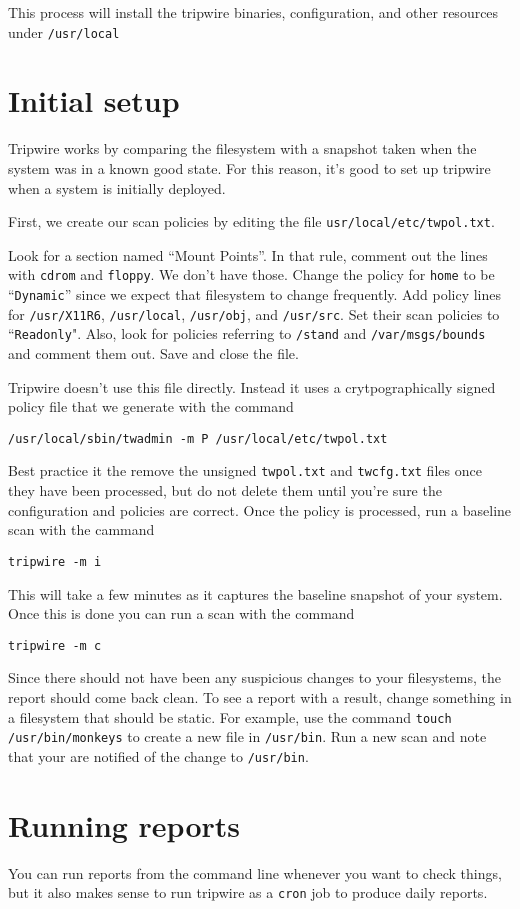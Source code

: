 \documentclass{article}
\begin{document}
This process will install the tripwire binaries, configuration, and other resources under \texttt{/usr/local}

\section{Initial setup}
Tripwire works by comparing the filesystem with a snapshot taken when the system was in a known good state.  For this reason, it's good to set up tripwire when a system is initially deployed.

First, we create our scan policies by editing the file \texttt{usr/local/etc/twpol.txt}.

Look for a section named ``Mount Points''. In that rule, comment out the lines with \texttt{cdrom} and \texttt{floppy}. We don't have those.  Change the policy for 
\texttt{home} to be ``\texttt{Dynamic}'' since we expect that filesystem to change frequently.  Add policy lines for \texttt{/usr/X11R6}, \texttt{/usr/local}, \texttt{/usr/obj}, and \texttt{/usr/src}.  Set their scan policies to ``\texttt{Readonly}". Also, look for policies referring to \texttt{/stand} and \texttt{/var/msgs/bounds} and comment them out. Save and close the file.

Tripwire doesn't use this file directly.  Instead it uses a crytpographically signed policy file that we generate with the command

\begin{verbatim}
/usr/local/sbin/twadmin -m P /usr/local/etc/twpol.txt
\end{verbatim}

Best practice it the remove the unsigned \texttt{twpol.txt} and \texttt{twcfg.txt} files once they have been processed, but do not delete them until you're sure the configuration and policies are correct.  Once the policy is processed, run a baseline scan with the cammand

\begin{verbatim}
tripwire -m i
\end{verbatim}

This will take a few minutes as it captures the baseline snapshot of your system.  Once this is done you can run a scan with the command

\begin{verbatim}
tripwire -m c
\end{verbatim}

Since there should not have been any suspicious changes to your filesystems, the report should come back clean.  To see a report with a result, change something in a filesystem that should be static.  For example, use the command \texttt{touch /usr/bin/monkeys} to create a new file in \texttt{/usr/bin}.  Run a new scan and note that your are notified of the change to \texttt{/usr/bin}.


\section{Running reports}
You can run reports from the command line whenever you want to check things, but it also makes sense to run tripwire as a \texttt{cron} job to produce daily reports.
\end{document}
